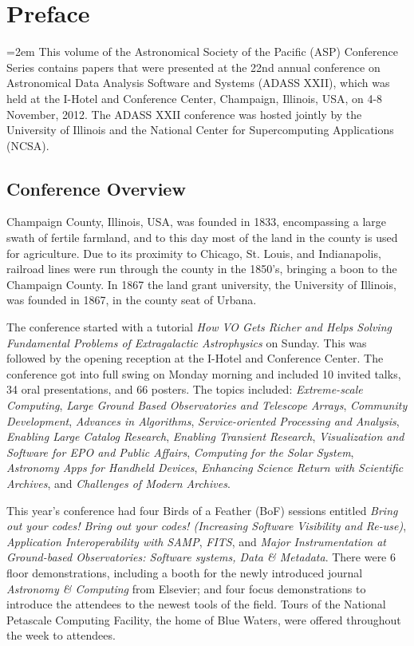 \pagestyle{myheadings}
\thispagestyle{plain}
\section*{\Large\bfseries Preface}
\bigskip
\parindent=2em
\setcounter{section}{1}
\noindent 
This volume of the Astronomical Society of the Pacific (ASP) Conference Series contains papers that were presented at the 22nd annual conference on Astronomical Data Analysis Software and Systems (ADASS XXII), which was held at the I-Hotel and Conference Center, Champaign, Illinois, USA, on 4-8 November, 2012. The ADASS XXII conference was hosted jointly by the University of Illinois and the National Center for Supercomputing Applications (NCSA).

\subsection{Conference Overview}
Champaign County, Illinois, USA, was founded in 1833, encompassing a large swath of fertile farmland, and to this day most of the land in the county is used for agriculture. Due to its proximity to Chicago, St. Louis, and Indianapolis, railroad lines were run through the county in the 1850's, bringing a boon to the Champaign County. In 1867 the land grant university, the University of Illinois, was founded in 1867, in the county seat of Urbana.

The conference started with a tutorial {\it How VO Gets Richer and Helps Solving Fundamental Problems of Extragalactic Astrophysics} on Sunday. This was followed by the opening reception at the I-Hotel and Conference Center. The conference got into full swing on Monday morning and included 10 invited talks, 34 oral presentations, and 66 posters. The topics included: \textit{Extreme-scale Computing}, \textit{Large Ground Based Observatories and Telescope Arrays}, \textit{Community Development}, \textit{Advances in Algorithms}, \textit{Service-oriented Processing and Analysis}, \textit{Enabling Large Catalog Research}, \textit{Enabling Transient Research}, \textit{Visualization and Software for EPO and Public Affairs}, \textit{Computing for the Solar System}, \textit{Astronomy Apps for Handheld Devices}, \textit{Enhancing Science Return with Scientific Archives}, and \textit{Challenges of Modern Archives}.

This year's conference had four Birds of a Feather (BoF) sessions entitled \textit{Bring out your codes! Bring out your codes! (Increasing Software Visibility and Re-use)}, \textit{Application Interoperability with SAMP}, \textit{FITS}, and \textit{Major Instrumentation at Ground-based Observatories: Software systems, Data \& Metadata}. There were 6 floor demonstrations, including a booth for the newly introduced journal \textit{Astronomy \& Computing} from Elsevier; and four focus demonstrations to introduce the attendees to the newest tools of the field. Tours of the National Petascale Computing Facility, the home of Blue Waters, were offered throughout the week to attendees.

